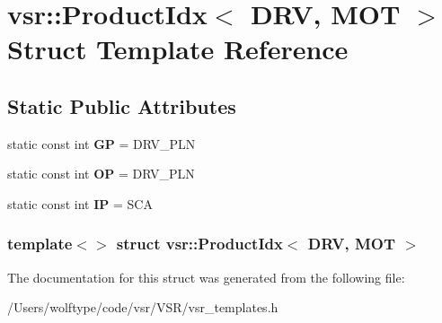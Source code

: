 \hypertarget{structvsr_1_1_product_idx_3_01_d_r_v_00_01_m_o_t_01_4}{\section{vsr\-:\-:Product\-Idx$<$ D\-R\-V, M\-O\-T $>$ Struct Template Reference}
\label{structvsr_1_1_product_idx_3_01_d_r_v_00_01_m_o_t_01_4}
}
\subsection*{Static Public Attributes}
\begin{DoxyCompactItemize}
\item 
\hypertarget{structvsr_1_1_product_idx_3_01_d_r_v_00_01_m_o_t_01_4_afa9df1fcfde2a5462b3060570e885f41}{static const int {\bfseries G\-P} = D\-R\-V\-\_\-\-P\-L\-N}\label{structvsr_1_1_product_idx_3_01_d_r_v_00_01_m_o_t_01_4_afa9df1fcfde2a5462b3060570e885f41}

\item 
\hypertarget{structvsr_1_1_product_idx_3_01_d_r_v_00_01_m_o_t_01_4_a575f5bfc12aad211a67af72f62628187}{static const int {\bfseries O\-P} = D\-R\-V\-\_\-\-P\-L\-N}\label{structvsr_1_1_product_idx_3_01_d_r_v_00_01_m_o_t_01_4_a575f5bfc12aad211a67af72f62628187}

\item 
\hypertarget{structvsr_1_1_product_idx_3_01_d_r_v_00_01_m_o_t_01_4_a0551134082b0b011bddbafbfcab94a68}{static const int {\bfseries I\-P} = S\-C\-A}\label{structvsr_1_1_product_idx_3_01_d_r_v_00_01_m_o_t_01_4_a0551134082b0b011bddbafbfcab94a68}

\end{DoxyCompactItemize}
\subsubsection*{template$<$$>$ struct vsr\-::\-Product\-Idx$<$ D\-R\-V, M\-O\-T $>$}



The documentation for this struct was generated from the following file\-:\begin{DoxyCompactItemize}
\item 
/\-Users/wolftype/code/vsr/\-V\-S\-R/vsr\-\_\-templates.\-h\end{DoxyCompactItemize}
